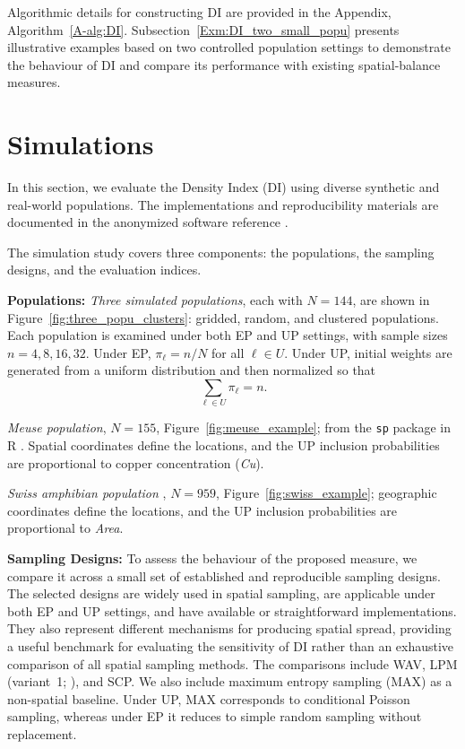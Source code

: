 \documentclass[12pt]{imsart}
\theoremstyle{plain}
\theoremstyle{remark}
\begin{document}
Algorithmic details for constructing DI are provided in the Appendix,
Algorithm~\ref{A-alg:DI}. Subsection~\ref{Exm:DI_two_small_popu} presents
illustrative examples based on two controlled population settings to
demonstrate the behaviour of DI and compare its performance with existing
spatial-balance measures.

\section{Simulations}\label{Sec:Simulation}
In this section, we evaluate the Density Index (DI) using diverse synthetic and real-world populations. The implementations and reproducibility materials are documented in the anonymized software reference \citep{graphical_sampling_2025_blind}.

The simulation study covers three components: the populations, the sampling designs, and the evaluation indices.

\textbf{Populations:} 
\textit{Three simulated populations}, each with \(N=144\), are shown in
Figure~\ref{fig:three_popu_clusters}: gridded, random, and clustered
populations. Each population is examined under both EP and UP settings, with
sample sizes \(n=4,8,16,32\). Under EP, \(\pi_\ell=n/N\) for all
\(\ell\in U\). Under UP, initial weights are generated from a uniform
distribution and then normalized so that
\[
\sum_{\ell\in U}\pi_\ell=n .
\]

\textit{Meuse population}, \(N=155\),
Figure~\ref{fig:meuse_example}; from the \texttt{sp} package in R
\citep{packagesp}. Spatial coordinates define the locations, and the UP
inclusion probabilities are proportional to copper concentration
(\emph{Cu}).

\textit{Swiss amphibian population} \citep{karch_website}, \(N=959\),
Figure~\ref{fig:swiss_example}; geographic coordinates define the
locations, and the UP inclusion probabilities are proportional to
\emph{Area}.


\textbf{Sampling Designs:}
To assess the behaviour of the proposed measure, we compare it across a small
set of established and reproducible sampling designs. The selected designs are
widely used in spatial sampling, are applicable under both EP and UP settings,
and have available or straightforward implementations. They also represent
different mechanisms for producing spatial spread, providing a useful benchmark
for evaluating the sensitivity of DI rather than an exhaustive comparison of
all spatial sampling methods. The comparisons include WAV, LPM
(variant~1; \citealp{gra:lun:sch:12}), and SCP.  We also include maximum entropy sampling (MAX) \citep{hajek1981, til:06} as a
non-spatial baseline. Under UP, MAX corresponds to conditional Poisson
sampling, whereas under EP it reduces to simple random sampling without
replacement.
\end{document}
